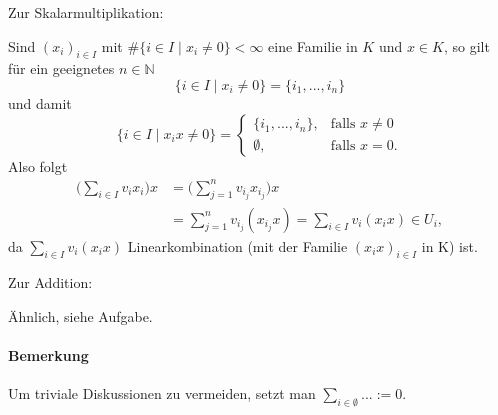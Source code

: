 Zur Skalarmultiplikation:
        \begin{addmargin}[25pt]{0pt}
	Sind $(x_i)_{i\in I}$ mit $\#\{i\in I \mid x_i \neq 0\}<\infty$ eine Familie in $ K $ und $x\in K$, so gilt für ein geeignetes $n\in \mathbb{N}$
		\[ \{i\in I\mid x_i \neq 0\} = \{i_1, ... , i_n\} \]
	und damit
	\begin{equation*}
		\{i\in I\mid x_ix\neq 0\} =
		\begin{cases}
			\{{i_1,...,i_n\}},& \text{falls }x \neq 0\\
			\emptyset,& \text{falls }x = 0.
		\end{cases}
	\end{equation*}
	Also folgt
	\begin{align*}
		\bigg(\sum_{i\in I}v_i x_i\bigg) x &= \bigg(\sum_{j=1}^{n} v_{i_j}x_{i_j}\bigg)x\\
		&= \sum_{j=1}^{n} v_{i_j}(x_{i_j}x) = \sum_{i\in I} v_i(x_ix) \in U_i,
	\end{align*}
	da $\sum_{i\in I} v_i(x_ix)$ Linearkombination (mit der Familie $(x_ix)_{i\in I}$ in K) ist.
	\end{addmargin}

Zur Addition:
        \begin{addmargin}[25pt]{0pt}
            Ähnlich, siehe Aufgabe.
	\end{addmargin}
	
\paragraph{Bemerkung}
	Um triviale Diskussionen zu vermeiden, setzt man $\sum_{i\in \emptyset} ...:=0$.
